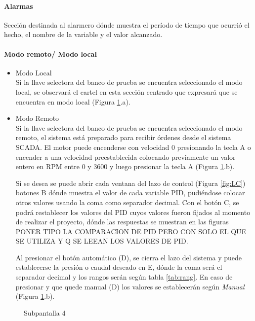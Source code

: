 \paragraph{Alarmas}
Sección destinada al alarmero dónde muestra el período de tiempo que ocurrió el hecho, el nombre de la variable y el valor alcanzado.
\paragraph{Modo remoto/ Modo local}
\begin{itemize}
	\item Modo Local\\
	Si la llave selectora del banco de prueba se encuentra seleccionado el modo local, se observará el cartel en esta sección centrado que expresará que se encuentra en modo local (Figura \ref{fig:localremoto}.a).
	\item Modo Remoto\\
	Si la llave selectora del banco de prueba se encuentra seleccionado el modo remoto, el sistema está preparado para recibir órdenes desde el sistema SCADA. El motor puede encenderse con velocidad 0 presionando la tecla A o encender a una velocidad preestablecida colocando previamente un valor entero en RPM entre 0 y 3600 y luego presionar la tecla A (Figura \ref{fig:localremoto}.b). 
	
	Si se desea se puede abrir cada ventana del lazo de control (Figura \ref{fig:LC}) botones B dónde muestra el valor de cada variable PID, pudiéndose colocar otros valores usando la coma como separador decimal. Con el botón C, se podrá restablecer los valores del PID cuyos valores fueron fijados al momento de realizar el proyecto, dónde las respuestas se muestran en las figuras PONER TIPO LA COMPARACION DE PID PERO CON SOLO EL QUE SE UTILIZA Y Q SE LEEAN LOS VALORES DE PID. 
	
	Al presionar el botón automático (D), se cierra el lazo del sistema y puede establecerse la presión o caudal deseado en E, dónde la coma será el separador decimal y los rangos serán según tabla \ref{tab:rang}. En caso de presionar y que quede manual (D) los valores se establecerán según \textit{Manual} (Figura \ref{fig:localremoto}.b). 
\end{itemize}

\begin{figure}[htbp]
	\centering
	\caption{Subpantalla 4} \label{fig:localremoto}
\end{figure}

